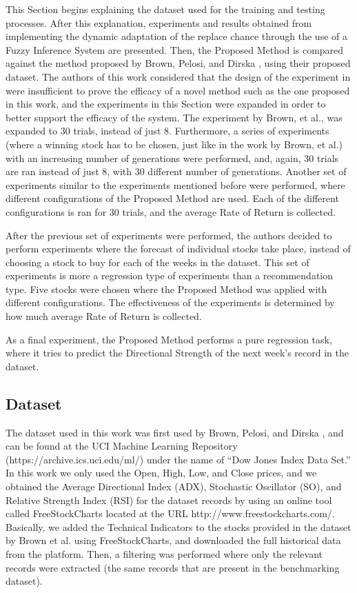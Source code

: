 \documentclass[12pt,journal,draftcls,onecolumn]{IEEEtran}
\begin{document}
This Section begins explaining the dataset used for the training and
testing processes. After this explanation, experiments and results
obtained from implementing the dynamic adaptation of the replace
chance through the use of a Fuzzy Inference System are
presented. Then, the Proposed Method is compared against the method
proposed by Brown, Pelosi, and Dirska \cite{brown2013dynamic}, using
their proposed dataset. The authors of this work considered that the
design of the experiment in \cite{brown2013dynamic} were insufficient
to prove the efficacy of a novel method such as the one proposed in
this work, and the experiments in this Section were expanded in order
to better support the efficacy of the system. The experiment by Brown,
et al., was expanded to 30 trials, instead of just 8. Furthermore, a
series of experiments (where a winning stock has to be chosen, just
like in the work by Brown, et al.) with an increasing number of
generations were performed, and, again, 30 trials are ran instead of
just 8, with 30 different number of generations. Another set of
experiments similar to the experiments mentioned before were
performed, where different configurations of the Proposed Method are
used. Each of the different configurations is ran for 30 trials, and
the average Rate of Return is collected.

After the previous set of experiments were performed, the authors
decided to perform experiments where the forecast of individual stocks
take place, instead of choosing a stock to buy for each of the weeks
in the dataset. This set of experiments is more a regression type of
experiments than a recommendation type. Five stocks were chosen
where the Proposed Method was applied with different
configurations. The effectiveness of the experiments is
determined by how much average Rate of Return is collected.

As a final experiment, the Proposed Method performs a pure regression
task, where it tries to predict the Directional Strength of the next
week's record in the dataset.

\subsection{Dataset}
\label{dataset}

The dataset used in this work was first used by Brown, Pelosi, and Dirska \cite{brown2013dynamic}, and can be found at the UCI Machine Learning Repository (https://archive.ics.uci.edu/ml/) under the name of ``Dow Jones Index Data Set.'' In this work we only used the Open, High, Low, and Close prices, and we obtained the Average Directional Index (ADX), Stochastic Oscillator (SO), and Relative Strength Index (RSI) for the dataset records by using an online tool called FreeStockCharts located at the URL http://www.freestockcharts.com/. Basically, we added the Technical Indicators to the stocks provided in the dataset by Brown et al. using FreeStockCharts, and downloaded the full historical data from the platform. Then, a filtering was performed where only the relevant records were extracted (the same records that are present in the benchmarking dataset).
\end{document}

